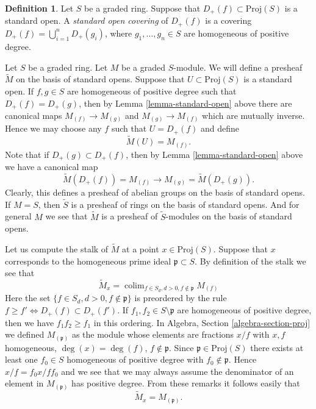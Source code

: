 \documentclass{stacks-project}
\theoremstyle{plain}
\theoremstyle{definition}
\newtheorem{definition}[subsection]{Definition}
\theoremstyle{remark}
\numberwithin{equation}{subsection}
\def\colim{\mathop{\mathrm{colim}}\nolimits}
\begin{document}
\begin{definition}
\label{definition-standard-covering}
Let $S$ be a graded ring.
Suppose that $D_{+}(f) \subset \text{Proj}(S)$ is a standard
open. A {\it standard open covering} of $D_{+}(f)$
is a covering $D_{+}(f) = \bigcup_{i = 1}^n D_{+}(g_i)$,
where $g_1, \ldots, g_n \in S$ are homogeneous of positive degree.
\end{definition}

\noindent
Let $S$ be a graded ring. Let $M$ be a graded $S$-module. We will define
a presheaf $\widetilde M$ on the basis of standard opens.
Suppose that $U \subset \text{Proj}(S)$ is a standard open.
If $f, g \in S$ are homogeneous of positive degree
such that $D_{+}(f) = D_{+}(g)$, then
by Lemma \ref{lemma-standard-open} above there are canonical
maps $M_{(f)} \to M_{(g)}$ and $M_{(g)} \to M_{(f)}$ which are
mutually inverse. Hence we may choose any $f$ such that $U = D_{+}(f)$
and define
$$
\widetilde M(U) = M_{(f)}.
$$
Note that if $D_{+}(g) \subset D_{+}(f)$, then by
Lemma \ref{lemma-standard-open} above we have
a canonical map
$$
\widetilde M(D_{+}(f)) = M_{(f)} \longrightarrow
M_{(g)} = \widetilde M(D_{+}(g)).
$$
Clearly, this defines a presheaf of abelian groups on the basis
of standard opens. If $M = S$, then $\widetilde S$ is a presheaf
of rings on the basis of standard opens. And for general $M$ we
see that $\widetilde M$ is a presheaf of $\widetilde S$-modules
on the basis of standard opens.

\medskip\noindent
Let us compute the stalk of $\widetilde M$ at a point
$x \in \text{Proj}(S)$.
Suppose that $x$ corresponds to the homogeneous prime
ideal $\mathfrak p \subset S$.
By definition of the stalk we see that
$$
\widetilde M_x
=
\colim_{f\in S_d, d > 0, f\not\in \mathfrak p} M_{(f)}
$$
Here the set $\{f \in S_d, d > 0, f \not \in \mathfrak p\}$ is preordered by
the rule $f \geq f' \Leftrightarrow D_{+}(f) \subset D_{+}(f')$.
If $f_1, f_2 \in S \setminus \mathfrak p$ are homogeneous of positive
degree, then we have
$f_1f_2 \geq f_1$ in this ordering. In
Algebra, Section \ref{algebra-section-proj}
we defined $M_{(\mathfrak p)}$ as the module whose elements are fractions
$x/f$ with $x, f$ homogeneous, $\deg(x) = \deg(f)$, $f \not \in \mathfrak p$.
Since $\mathfrak p \in \text{Proj}(S)$ there exists at least
one $f_0 \in S$ homogeneous of positive degree with $f_0 \not\in \mathfrak p$.
Hence $x/f = f_0x/ff_0$ and we see that we may always assume
the denominator of an element in $M_{(\mathfrak p)}$ has positive degree.
From these remarks it follows easily that
$$
\widetilde M_x = M_{(\mathfrak p)}.
$$
\end{document}
